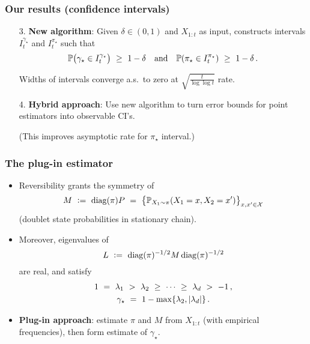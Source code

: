 \documentclass[11pt,compress,blue4]{beamer}
\newcommand\fns\footnotesize
\newcommand\pimin{\ensuremath{\pi_{\star}}}
\newcommand\gap{\ensuremath{\gamma_{\star}}}
\newcommand\states{\ensuremath{\mathcal{X}}}
\begin{document}
\begin{frame}
  \frametitle{Our results (confidence intervals)}

  \begin{enumerate}
    \item[3.]
      \textbf{New algorithm}:
      Given $\delta \in (0,1)$ and $X_{1:t}$ as input, constructs
      intervals $I_t^{\gap}$ and $I_t^{\pimin}$ such that
      \[
        \P\Parens{
          \gap \in I_t^{\gap}
        }
        \ \geq \ 1-\delta
        \quad
        \text{and}
        \quad
        \P\Parens{
          \pimin \in I_t^{\pimin}
        }
        \ \geq \ 1-\delta
        \,.
      \]

      Widths of intervals converge a.s.~to zero at
      $\sqrt{\frac{t}{\log\log t}}$ rate.

      \medskip

    \item[4.]
      \textbf{Hybrid approach}:
      Use new algorithm to turn error bounds for point estimators into
      observable CI's.

      {\fns(This improves asymptotic rate for $\pimin$ interval.)}

  \end{enumerate}

\end{frame}


\begin{frame}
  \frametitle{The plug-in estimator}

  \begin{itemize}
    \item
      Reversibility grants the symmetry of
      \[
        M
        \ := \
        \diag(\pi) P
        \ = \
        \Braces{ \P_{X_1 \sim \pi}(X_1=x,X_2=x') }_{x,x'\in\states}
      \]
      {\fns(doublet state probabilities in stationary chain)}.

      \smallskip

    \item
      Moreover, eigenvalues of
      \[
        L
        \ := \
        \operatorname{diag}(\pi)^{-1/2} M \operatorname{diag}(\pi)^{-1/2}
      \]
      are real, and satisfy
      \begin{gather*}
        1
        \ = \ \lambda_1 \ > \ \lambda_2 \ \geq \ \dotsb \ \geq \
        \lambda_d \ > \ -1
        \,,
        \\
        \gap
        \ = \ 1 - \max\braces{ \lambda_2, \abs{\lambda_d} }
        \,.
      \end{gather*}

      \smallskip

    \item
      \textbf{Plug-in approach}:
      estimate $\pi$ and $M$ from $X_{1:t}$ (with empirical
      frequencies), then form estimate of $\gap$.

  \end{itemize}

\end{frame}
\end{document}
